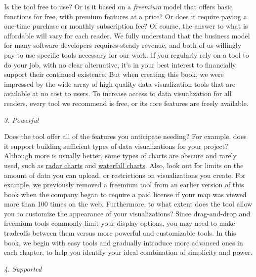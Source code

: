 \documentclass[
  english,
]{book}
\begin{document}
Is the tool free to use? Or is it based on a \emph{freemium} model that offers basic functions for free, with premium features at a price? Or does it require paying a one-time purchase or monthly subscription fee? Of course, the answer to what is affordable will vary for each reader. We fully understand that the business model for many software developers requires steady revenue, and both of us willingly pay to use specific tools necessary for our work. If you regularly rely on a tool to do your job, with no clear alternative, it's in your best interest to financially support their continued existence. But when creating this book, we were impressed by the wide array of high-quality data visualization tools that are available at no cost to users. To increase access to data visualization for all readers, every tool we recommend is free, or its core features are freely available.

\emph{3. Powerful}

Does the tool offer all of the features you anticipate needing? For example, does it support building sufficient types of data visualizations for your project? Although more is usually better, some types of charts are obscure and rarely used, such as \href{https://en.wikipedia.org/wiki/Radar_chart}{radar charts} and \href{https://en.wikipedia.org/wiki/Waterfall_chart}{waterfall charts}. Also, look out for limits on the amount of data you can upload, or restrictions on visualizations you create. For example, we previously removed a freemium tool from an earlier version of this book when the company began to require a paid license if your map was viewed more than 100 times on the web. Furthermore, to what extent does the tool allow you to customize the appearance of your visualizations? Since drag-and-drop and freemium tools commonly limit your display options, you may need to make tradeoffs between them versus more powerful and customizable tools. In this book, we begin with easy tools and gradually introduce more advanced ones in each chapter, to help you identify your ideal combination of simplicity and power.

\emph{4. Supported}
\end{document}

